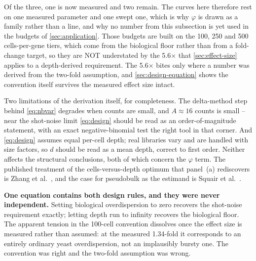 Of the three, one is now measured and two remain. The curves here therefore rest
on one measured parameter and one swept one, which is why $\varphi$ is drawn as a
family rather than a line, and why no number from this subsection is yet used in
the budgets of \cref{sec:application}. Those budgets are built on the 100, 250 and
500 cells-per-gene tiers, which come from the biological floor rather than from a
fold-change target, so they are NOT understated by the 5.6$\times$ that
\cref{sec:effect-size} applies to a depth-derived requirement. The
5.6$\times$ bites only where a number was derived from the two-fold assumption,
and \cref{sec:design-equation} shows the convention itself survives the measured
effect size intact.

Two limitations of the derivation itself, for completeness. The delta-method step
behind \cref{eq:nbvar} degrades when counts are small, and $A\approx16$ counts is
small -- near the shot-noise limit \cref{eq:design} should be read as an
order-of-magnitude statement, with an exact negative-binomial test the right tool
in that corner. And \cref{eq:design} assumes equal per-cell depth; real libraries
vary and are handled with size factors, so $d$ should be read as a mean depth,
correct to first order. Neither affects the structural conclusions, both of which
concern the $\varphi$ term. The published treatment of the cells-versus-depth
optimum that panel~(a) rediscovers is Zhang et
al.\ \citep{zhangDeterminingSequencingDepth2020}, and the case for pseudobulk as
the estimand is Squair et al.\ \citep{squairConfrontingFalseDiscoveries2021}.

\begin{keybox}
\textbf{One equation contains both design rules, and they were never
independent.} Setting biological overdispersion to zero recovers the shot-noise
requirement exactly; letting depth run to infinity recovers the biological
floor. The apparent tension in the 100-cell convention dissolves once the effect
size is measured rather than assumed: at the measured 1.34-fold it corresponds
to an entirely ordinary yeast overdispersion, not an implausibly bursty one. The
convention was right and the two-fold assumption was wrong.
\end{keybox}
